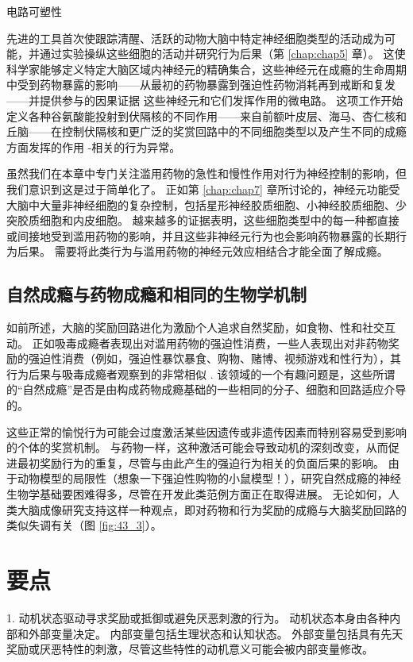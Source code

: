 电路可塑性

先进的工具首次使跟踪清醒、活跃的动物大脑中特定神经细胞类型的活动成为可能，并通过实验操纵这些细胞的活动并研究行为后果（第 \ref{chap:chap5} 章）。 这使科学家能够定义特定大脑区域内神经元的精确集合，这些神经元在成瘾的生命周期中受到药物暴露的影响——从最初的药物暴露到强迫性药物消耗再到戒断和复发——并提供参与的因果证据 这些神经元和它们发挥作用的微电路。 这项工作开始定义各种谷氨酸能投射到伏隔核的不同作用——来自前额叶皮层、海马、杏仁核和丘脑——在控制伏隔核和更广泛的奖赏回路中的不同细胞类型以及产生不同的成瘾方面发挥的作用 -相关的行为异常。

虽然我们在本章中专门关注滥用药物的急性和慢性作用对行为神经控制的影响，但我们意识到这是过于简单化了。 正如第 \ref{chap:chap7} 章所讨论的，神经元功能受大脑中大量非神经细胞的复杂控制，包括星形神经胶质细胞、小神经胶质细胞、少突胶质细胞和内皮细胞。 越来越多的证据表明，这些细胞类型中的每一种都直接或间接地受到滥用药物的影响，并且这些非神经元行为也会影响药物暴露的长期行为后果。 需要将此类行为与滥用药物的神经元效应相结合才能全面了解成瘾。

\subsection{自然成瘾与药物成瘾和相同的生物学机制}
如前所述，大脑的奖励回路进化为激励个人追求自然奖励，如食物、性和社交互动。 正如吸毒成瘾者表现出对滥用药物的强迫性消费，一些人表现出对非药物奖励的强迫性消费（例如，强迫性暴饮暴食、购物、赌博、视频游戏和性行为），其行为后果与吸毒成瘾者观察到的非常相似 . 该领域的一个有趣问题是，这些所谓的“自然成瘾”是否是由构成药物成瘾基础的一些相同的分子、细胞和回路适应介导的。

这些正常的愉悦行为可能会过度激活某些因遗传或非遗传因素而特别容易受到影响的个体的奖赏机制。 与药物一样，这种激活可能会导致动机的深刻改变，从而促进最初奖励行为的重复，尽管与由此产生的强迫行为相关的负面后果的影响。 由于动物模型的局限性（想象一下强迫性购物的小鼠模型！），研究自然成瘾的神经生物学基础要困难得多，尽管在开发此类范例方面正在取得进展。 无论如何，人类大脑成像研究支持这样一种观点，即对药物和行为奖励的成瘾与大脑奖励回路的类似失调有关（图 \ref{fig:43_3}）。


\section{要点}
1. 动机状态驱动寻求奖励或抵御或避免厌恶刺激的行为。 动机状态本身由各种内部和外部变量决定。 内部变量包括生理状态和认知状态。 外部变量包括具有先天奖励或厌恶特性的刺激，尽管这些特性的动机意义可能会被内部变量修改。 

